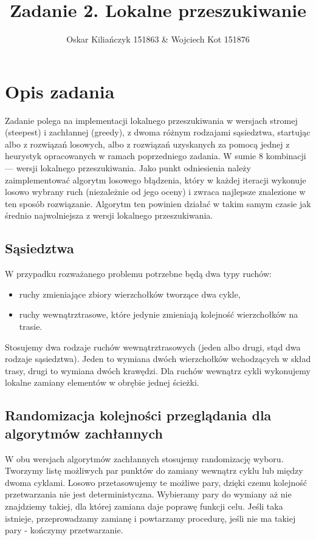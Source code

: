 \documentclass[11pt]{article}
\title{Zadanie 2. Lokalne przeszukiwanie}
\author{Oskar Kiliańczyk 151863 \& Wojciech Kot 151876}
\date{}
\begin{document}
\maketitle
\newpage

\section{Opis zadania}\label{sec:opis-zadania}
Zadanie polega na implementacji lokalnego przeszukiwania w wersjach stromej (steepest) i zachłannej (greedy), z dwoma różnym rodzajami sąsiedztwa,
startując albo z rozwiązań losowych, albo z rozwiązań uzyskanych za pomocą jednej z heurystyk opracowanych w ramach poprzedniego zadania.
W sumie 8 kombinacji --- wersji lokalnego przeszukiwania.
Jako punkt odniesienia należy zaimplementować algorytm losowego błądzenia, który w każdej iteracji wykonuje losowo wybrany ruch (niezależnie od jego oceny) i zwraca najlepsze znalezione w ten sposób rozwiązanie.
Algorytm ten powinien działać w takim samym czasie jak średnio najwolniejsza z wersji lokalnego przeszukiwania.

\subsection{Sąsiedztwa}\label{subsec:sasiedztwa}
W przypadku rozważanego problemu potrzebne będą dwa typy ruchów:
\begin{itemize}
\item ruchy zmieniające zbiory wierzchołków tworzące dwa cykle,
\item ruchy wewnątrztrasowe, które jedynie zmieniają kolejność wierzchołków na trasie.
\end{itemize}
Stosujemy dwa rodzaje ruchów wewnątrztrasowych (jeden albo drugi, stąd dwa rodzaje sąsiedztwa).
Jeden to wymiana dwóch wierzchołków wchodzących w skład trasy, drugi to wymiana dwóch krawędzi.
Dla ruchów wewnątrz cykli wykonujemy lokalne zamiany elementów w obrębie jednej ścieżki.

\subsection{Randomizacja kolejności przeglądania dla algorytmów zachłannych}\label{subsec:randomizacja-kolejnosci-przegladania-dla-algorytmow-zachannych}
W obu wersjach algorytmów zachłannych stosujemy randomizację wyboru.
Tworzymy listę możliwych par punktów do zamiany wewnątrz cyklu lub między dwoma cyklami.
Losowo przetasowujemy te możliwe pary, dzięki czemu kolejność przetwarzania nie jest deterministyczna.
Wybieramy pary do wymiany aż nie znajdziemy takiej, dla której zamiana daje poprawę funkcji celu.
Jeśli taka istnieje, przeprowadzamy zamianę i powtarzamy procedurę, jeśli nie ma takiej pary - kończymy przetwarzanie.
\end{document}
